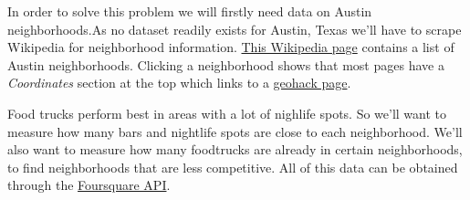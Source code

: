 \documentclass{deagle}
\begin{document}
In order to solve this problem we will firstly need data on Austin neighborhoods.As no dataset readily exists for Austin, Texas we'll have to scrape Wikipedia for neighborhood information. \href{https://en.wikipedia.org/wiki/Category:Neighborhoods_in_Austin,_Texas}{This Wikipedia page} contains a list of Austin neighborhoods. Clicking a neighborhood shows that most pages have a \emph{Coordinates} section at the top which links to a \href{https://geohack.toolforge.org/geohack.php?pagename=Anderson_Mill,_Austin,_Texas&params=30_27_18_N_97_48_33_W_region:US-TX_type:city(8953)}{geohack page}.

Food trucks perform best in areas with a lot of nighlife spots. So we'll want to measure how many bars and nightlife spots are close to each neighborhood. We'll also want to measure how many foodtrucks are already in certain neighborhoods, to find neighborhoods that are less competitive. All of this data can be obtained through the \href{https://foursquare.com/developers/apps}{Foursquare API}.


%
\end{document}

